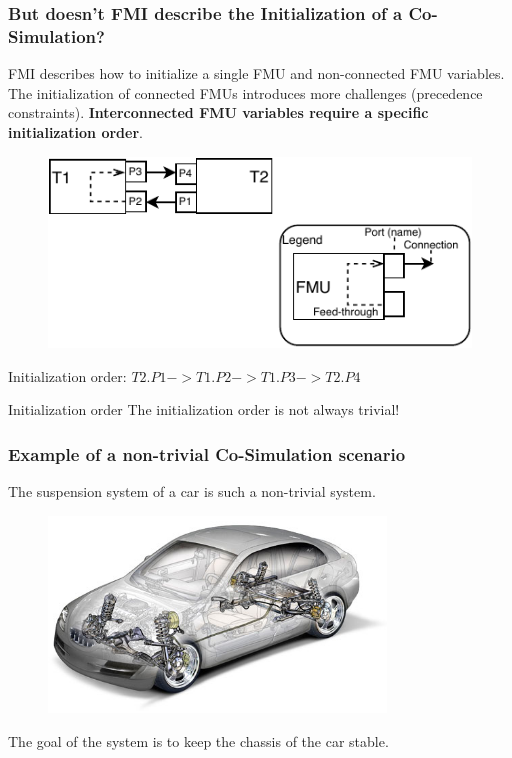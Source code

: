 \documentclass{beamer}
\begin{document}
\begin{frame}
\frametitle{But doesn't FMI describe the Initialization of a Co-Simulation?}
FMI describes how to initialize a single FMU and non-connected FMU variables.
The initialization of connected FMUs introduces more challenges (precedence constraints).
\textbf{Interconnected FMU variables require a specific initialization order}.

\begin{figure}
    \centering
    \includegraphics[scale=1.0]{images/SimpleFMUS.pdf}
\end{figure}
Initialization order: $T2.P1 -> T1.P2 -> T1.P3 -> T2.P4$
\begin{alertblock}{Initialization order} 
    The initialization order is not always trivial! 
\end{alertblock}
\end{frame}

\begin{frame}
\frametitle{Example of a non-trivial Co-Simulation scenario}
The suspension system of a car is such a non-trivial system.
\begin{figure}
    \centering
    \includegraphics[width=0.8\textwidth]{images/suspension-system.jpg}
\end{figure}
The goal of the system is to keep the chassis of the car stable.
\end{frame}
\end{document}
